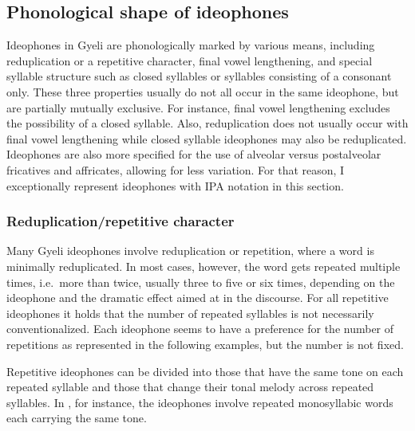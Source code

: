 \subsection{Phonological shape of ideophones} 
\label{sec:IDEOphon}

Ideophones in Gyeli are phonologically  marked by various means, including reduplication or a repetitive character, final vowel lengthening, and special syllable structure such as closed syllables or syllables consisting of a consonant only. These three properties usually do not all occur in the same ideophone, but are partially mutually exclusive. For instance, final vowel lengthening excludes the possibility of a closed syllable. Also, reduplication does not usually  occur with final vowel lengthening while closed syllable ideophones may also be reduplicated.  Ideophones are also more specified for the use of alveolar versus postalveolar fricatives and affricates, allowing for less variation. For that reason, I exceptionally represent ideophones with IPA notation in this section. 

\subsubsection*{Reduplication/repetitive character}

Many Gyeli ideophones involve reduplication or repetition, where a word is minimally reduplicated. In most cases, however, the word gets repeated multiple times, i.e.\ more than twice, usually three to five or six times, depending on the ideophone and the dramatic effect aimed at in the discourse. 
For all repetitive ideophones it holds that the number of repeated syllables is not necessarily conventionalized. Each ideophone seems to have a preference for the number of repetitions as represented in the following examples, but the number is not fixed.

Repetitive ideophones can be divided into those that have the same tone on each repeated syllable and those that change their tonal melody across repeated syllables. In , for instance, the ideophones involve repeated monosyllabic words each carrying the same tone.



